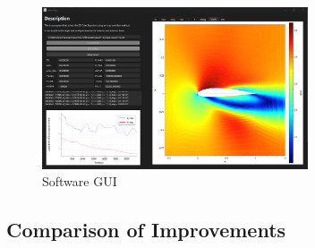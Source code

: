 \documentclass{article}
\begin{document}
\begin{figure}[H]
    \centering
    \includegraphics[width=0.7\textwidth]{figures/software.png}
    \caption{Software GUI}
    \label{fig:software}
\end{figure}

\subsection{Comparison of Improvements}
\end{document}
